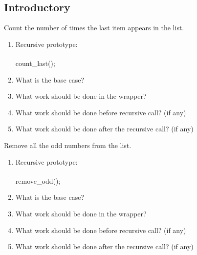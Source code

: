 \documentclass[../../main.tex]{subfiles}
\begin{document}
\subsection{Introductory}
\begin{steps}
   \item Count the number of times the last item appears in the list.
      \begin{enumerate}[label=\Alph*.]
         \item Recursive prototype:\\
            \vspace{.5cm}\\
            \underline{\hspace{4cm}}count_last(\underline{\hspace{4cm}});
         \item What is the base case?\\
            \vspace{.5cm}
         \item What work should be done in the wrapper?\\
            \vspace{.5cm}
         \item What work should be done before recursive call? (if any)\\
            \vspace{.5cm}
         \item What work should be done after the recursive call? (if any)\\
            \vspace{.5cm}
      \end{enumerate}
   \item Remove all the odd numbers from the list.\\
      \begin{enumerate}[label=\Alph*.]
         \item Recursive prototype:\\
            \vspace{.5cm}\\
            \underline{\hspace{4cm}}remove_odd(\underline{\hspace{4cm}});
         \item What is the base case?\\
            \vspace{.5cm}
         \item What work should be done in the wrapper?\\
            \vspace{.5cm}
         \item What work should be done before recursive call? (if any)\\
            \vspace{.5cm}
         \item What work should be done after the recursive call? (if any)\\
            \vspace{.5cm}
      \end{enumerate}
\end{steps}
\end{document}
